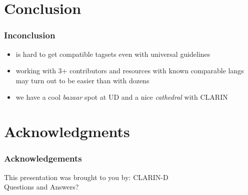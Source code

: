 \documentclass[t]{beamer}
\begin{document}
\section{Conclusion}

\begin{frame}
    \frametitle{Inconclusion}
    \begin{itemize}
        \item is hard to get compatible tagsets even with universal 
            guidelines
        \item working with 3+ contributors and resources with known comparable
            langs may turn out to be easier than with dozens
        \item we have a cool \textit{bazaar} spot at UD and a nice 
            \textit{cathedral} with CLARIN
    \end{itemize}
\end{frame}

\section{Acknowledgments}

\begin{frame}
    \frametitle{Acknowledgements}
    This presentation was brought to you by: CLARIN-D\\
    \vspace{2em}
    Questions and Answers?
\end{frame}
\end{document}
